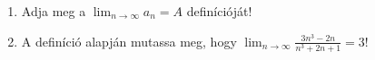 \documentclass[11pt]{scrartcl}
\begin{document}
\begin{enumerate}
	\item Adja meg a $\lim_{n \to \infty} a_n = A$ definícióját!

	\item A definíció alapján mutassa meg, hogy
	      \(\displaystyle \lim_{n \to \infty} \frac{3n^3 - 2n}{n^3 + 2n + 1} = 3\)!
\end{enumerate}
\end{document}
